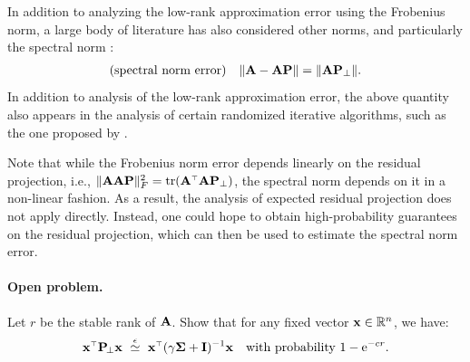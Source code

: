 \documentclass[11pt]{article}
\begin{document}
In addition to analyzing the low-rank approximation error using the
Frobenius norm, a large body of literature has also considered other
norms, and particularly the spectral norm \cite{tropp2011structure}:
\begin{align*}
  \text{(spectral norm error)}\quad \|\mathbf A-\mathbf A\mathbf P\| = \|\mathbf A\mathbf P_{\perp}\|.
\end{align*}
In addition to analysis of the low-rank approximation error, the above
quantity also appears in the analysis of certain randomized iterative
algorithms, such as the one proposed by \cite{lacotte2019high}.

Note that while the Frobenius norm error depends linearly on the residual projection,
i.e., $\|\A\-\A\P\|_F^2 = \tr(\A^\top\A\P_{\perp})$, the spectral norm
depends on it in a non-linear fashion. As a result, the analysis of
expected residual projection does not 
apply directly. Instead, one could hope to obtain high-probability
guarantees on the residual projection, which can then be used to
estimate the spectral norm error.

\paragraph{Open problem.} Let $r$ be the stable rank of $\mathbf A$. Show
that for any fixed vector $\mathbf x\in\mathbb R^n$, we have:
\begin{align*}
  \x^\top\P_{\!\perp}\x\ \overset\epsilon\simeq\ \x^\top(\gamma\Sigmab+\I)^{-1}\x\quad\text{with probability $1-\ee^{-cr}$}.
  \end{align*}
\end{document}
